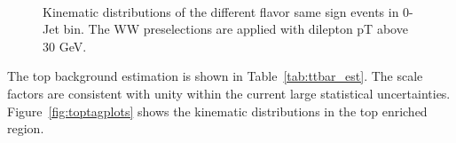 \begin{figure}[!hbtp]
{}
\\

\caption{Kinematic distributions of the different flavor same sign events in 0-Jet bin. 
The WW preselections are applied with dilepton pT above 30 GeV. }
\label{fig:ssplots}
\end{figure}

The top background estimation is shown in Table~\ref{tab:ttbar_est}. 
The scale factors are consistent with unity within 
the current large statistical uncertainties. 
Figure~\ref{fig:toptagplots} shows the kinematic distributions in the top enriched 
region. 

